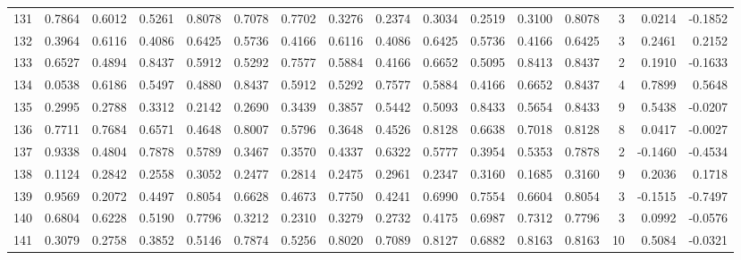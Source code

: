 \begin{tabular}{lrrrrrrrrrrrrrrr}
131 &      0.7864 &  0.6012 &  0.5261 &  0.8078 &  0.7078 &  0.7702 &  0.3276 &  0.2374 &  0.3034 &  0.2519 &   0.3100 &     0.8078 &      3 &                    0.0214 &                    -0.1852 \\
132 &      0.3964 &  0.6116 &  0.4086 &  0.6425 &  0.5736 &  0.4166 &  0.6116 &  0.4086 &  0.6425 &  0.5736 &   0.4166 &     0.6425 &      3 &                    0.2461 &                     0.2152 \\
133 &      0.6527 &  0.4894 &  0.8437 &  0.5912 &  0.5292 &  0.7577 &  0.5884 &  0.4166 &  0.6652 &  0.5095 &   0.8413 &     0.8437 &      2 &                    0.1910 &                    -0.1633 \\
134 &      0.0538 &  0.6186 &  0.5497 &  0.4880 &  0.8437 &  0.5912 &  0.5292 &  0.7577 &  0.5884 &  0.4166 &   0.6652 &     0.8437 &      4 &                    0.7899 &                     0.5648 \\
135 &      0.2995 &  0.2788 &  0.3312 &  0.2142 &  0.2690 &  0.3439 &  0.3857 &  0.5442 &  0.5093 &  0.8433 &   0.5654 &     0.8433 &      9 &                    0.5438 &                    -0.0207 \\
136 &      0.7711 &  0.7684 &  0.6571 &  0.4648 &  0.8007 &  0.5796 &  0.3648 &  0.4526 &  0.8128 &  0.6638 &   0.7018 &     0.8128 &      8 &                    0.0417 &                    -0.0027 \\
137 &      0.9338 &  0.4804 &  0.7878 &  0.5789 &  0.3467 &  0.3570 &  0.4337 &  0.6322 &  0.5777 &  0.3954 &   0.5353 &     0.7878 &      2 &                   -0.1460 &                    -0.4534 \\
138 &      0.1124 &  0.2842 &  0.2558 &  0.3052 &  0.2477 &  0.2814 &  0.2475 &  0.2961 &  0.2347 &  0.3160 &   0.1685 &     0.3160 &      9 &                    0.2036 &                     0.1718 \\
139 &      0.9569 &  0.2072 &  0.4497 &  0.8054 &  0.6628 &  0.4673 &  0.7750 &  0.4241 &  0.6990 &  0.7554 &   0.6604 &     0.8054 &      3 &                   -0.1515 &                    -0.7497 \\
140 &      0.6804 &  0.6228 &  0.5190 &  0.7796 &  0.3212 &  0.2310 &  0.3279 &  0.2732 &  0.4175 &  0.6987 &   0.7312 &     0.7796 &      3 &                    0.0992 &                    -0.0576 \\
141 &      0.3079 &  0.2758 &  0.3852 &  0.5146 &  0.7874 &  0.5256 &  0.8020 &  0.7089 &  0.8127 &  0.6882 &   0.8163 &     0.8163 &     10 &                    0.5084 &                    -0.0321 \\

\end{tabular}
